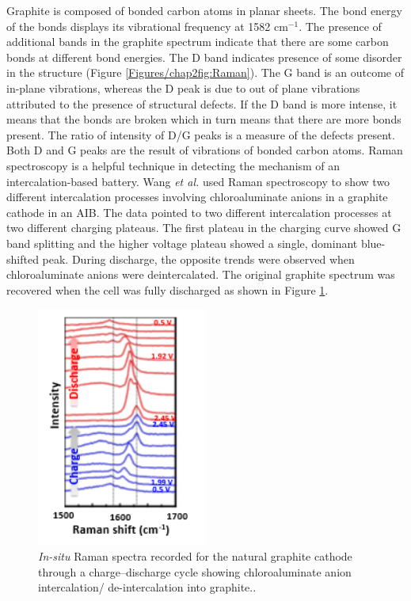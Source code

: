 Graphite is composed of  bonded carbon atoms in planar sheets. The bond energy of the  bonds displays its vibrational frequency at 1582 cm$^{-1}$. The presence of additional bands in the graphite spectrum indicate that there are some carbon bonds at different bond energies. The D band indicates presence of some disorder in the structure (Figure \ref{Figures/chap2fig:Raman}). The G band is an outcome of in-plane vibrations, whereas the D peak is due to out of plane vibrations attributed to the presence of structural defects. If the D band is more intense, it means that the  bonds are broken which in turn means that there are more  bonds present. The ratio of intensity of D/G peaks is a measure of the defects present. Both D and G peaks are the result of vibrations of  bonded carbon atoms.  
Raman spectroscopy is a helpful technique in detecting the mechanism of an intercalation-based battery. Wang \textit{et al.} used Raman spectroscopy to show two different intercalation processes involving chloroaluminate anions in a graphite cathode in an AIB. The data pointed to two different intercalation processes at two different charging plateaus. The first plateau in the charging curve showed G band splitting and the higher voltage plateau showed a single, dominant blue-shifted peak. During discharge, the opposite trends were observed when chloroaluminate anions were deintercalated. The original graphite spectrum was recovered when the cell was fully discharged\cite{wang_advanced_2017} as shown in Figure \ref{Figures/chap2fig:Raman2}. 

\begin{figure}[tbh!]
\centering
\includegraphics[width=0.5\textwidth]{Figures/chap2fig/Raman2}
\caption{\textit{In-situ} Raman spectra recorded for the natural graphite cathode through a charge–discharge cycle showing chloroaluminate anion intercalation/ de-intercalation into graphite.\cite{wang_advanced_2017}.}
\label{Figures/chap2fig:Raman2}
\end{figure}

